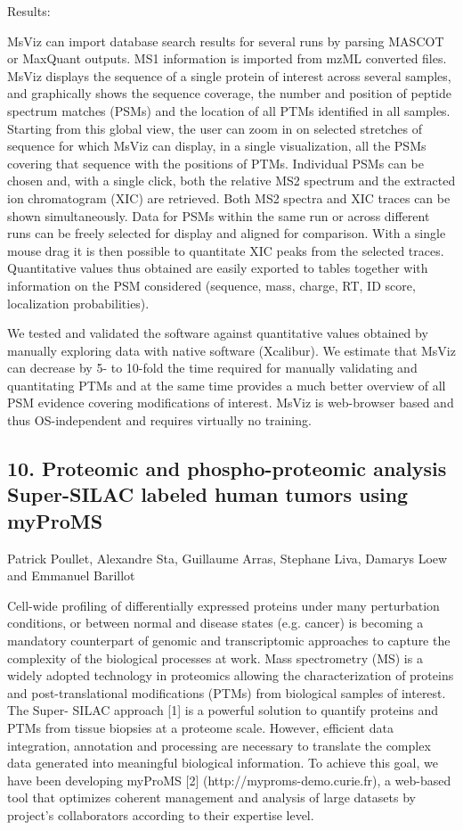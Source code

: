 Results:

MsViz can import database search results for several runs by parsing MASCOT or MaxQuant outputs. MS1 information is imported from mzML converted files. MsViz displays the sequence of a single protein of interest across several samples, and graphically shows the sequence coverage, the number and position of peptide spectrum matches (PSMs) and the location of all PTMs identified in all samples. Starting from this global view, the user can zoom in on selected stretches of sequence for which MsViz can display, in a single visualization, all the PSMs covering that sequence with the positions of PTMs. Individual PSMs can be chosen and, with a single click, both the relative MS2 spectrum and the extracted ion chromatogram (XIC) are retrieved. Both MS2 spectra and XIC traces can be shown simultaneously. Data for PSMs within the same run or across different runs can be freely selected for display and aligned for comparison. With a single mouse drag it is then possible to quantitate XIC peaks from the selected traces. Quantitative values thus obtained are easily exported to tables together with information on the PSM considered (sequence, mass, charge, RT, ID score, localization probabilities).

We tested and validated the software against quantitative values obtained by manually exploring data with native software (Xcalibur). We estimate that MsViz can decrease by 5- to 10-fold the time required for manually validating and quantitating PTMs and at the same time provides a much better overview of all PSM evidence covering modifications of interest. MsViz is web-browser based and thus OS-independent and requires virtually no training.

\subsection*{\color{eubicRed} 10. Proteomic and phospho-proteomic analysis Super-SILAC labeled human tumors using myProMS}
{\color{eubicGray}Patrick Poullet, Alexandre Sta, Guillaume Arras, Stephane Liva, Damarys Loew and Emmanuel Barillot}

Cell-wide profiling of differentially expressed proteins under many perturbation conditions, or between normal and disease states (e.g. cancer) is becoming a mandatory counterpart of genomic and transcriptomic approaches to capture the complexity of the biological processes at work. Mass spectrometry (MS) is a widely adopted technology in proteomics allowing the characterization of proteins and post-translational modifications (PTMs) from biological samples of interest. The Super- SILAC approach [1] is a powerful solution to quantify proteins and PTMs from tissue biopsies at a proteome scale. However, efficient data integration, annotation and processing are necessary to translate the complex data generated into meaningful biological information. To achieve this goal, we have been developing myProMS [2] (http://myproms-demo.curie.fr), a web-based tool that optimizes coherent management and analysis of large datasets by project’s collaborators according to their expertise level.

